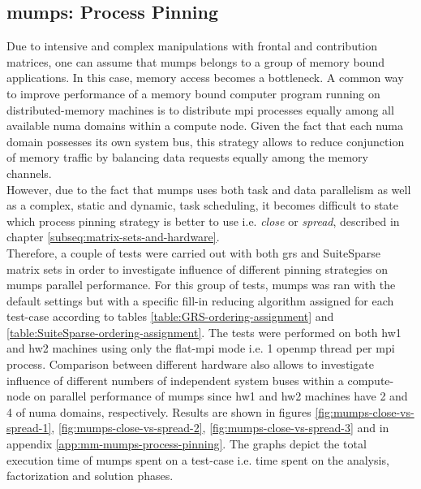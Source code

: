 \subsection{\gls{mumps}: Process Pinning}
\label{subseq:mm-mumps-process-pinning}

Due to intensive and complex manipulations with frontal and contribution matrices, one can assume that \gls{mumps} belongs to a group of memory bound applications. In this case, memory access becomes a bottleneck. A common way to improve performance of a memory bound computer program running on distributed-memory machines is to distribute \gls{mpi} processes equally among all available \gls{numa} domains within a compute node. Given the fact that each \gls{numa} domain possesses its own system bus, this strategy allows to reduce conjunction of memory traffic by balancing data requests equally among the memory channels.\\


However, due to the fact that \gls{mumps} uses both task and data parallelism as well as a complex, static and dynamic, task scheduling, it becomes difficult to state which process pinning strategy is better to use i.e. \textit{close} or \textit{spread}, described in chapter \ref{subseq:matrix-sets-and-hardware}.\\


Therefore, a couple of tests were carried out with both \gls{grs} and SuiteSparse matrix sets in order to investigate influence of different pinning strategies on \gls{mumps} parallel performance. For this group of tests, \gls{mumps} was ran with the default settings but with a specific fill-in reducing algorithm assigned for each test-case according to tables \ref{table:GRS-ordering-assignment} and \ref{table:SuiteSparse-ordering-assignment}. The tests were performed on both \gls{hw1} and \gls{hw2} machines using only the flat-\gls{mpi} mode i.e. 1 \gls{openmp} thread per \gls{mpi} process. Comparison between different hardware also allows to investigate influence of different numbers of independent system buses within a compute-node on parallel performance of \gls{mumps} since \gls{hw1} and \gls{hw2} machines have 2 and 4 of \gls{numa} domains, respectively. Results are shown in figures \ref{fig:mumps-close-vs-spread-1}, \ref{fig:mumps-close-vs-spread-2}, \ref{fig:mumps-close-vs-spread-3} and in appendix \ref{app:mm-mumps-process-pinning}. The graphs depict the total execution time of \gls{mumps} spent on a test-case i.e. time spent on the analysis, factorization and solution phases.\\

